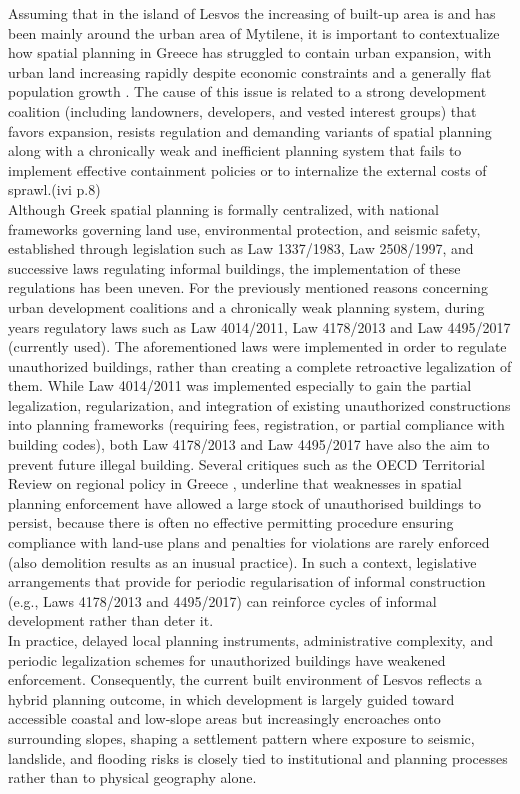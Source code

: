 \documentclass[10pt, twocolumn, twoside]{article}
\begin{document}
Assuming that in the island of Lesvos the increasing of built-up area is and has been mainly around the urban area of Mytilene, it is important to contextualize how spatial planning in Greece has struggled to contain urban expansion, with urban land increasing rapidly despite economic constraints and a generally flat population growth \cite{Stathakis2024Urbanization}. The cause of this issue is related to a strong development coalition (including landowners, developers, and vested interest groups) that favors expansion, resists regulation and demanding variants of spatial planning  along with a chronically weak and inefficient planning system that fails to implement effective containment policies or to internalize the external costs of sprawl.(ivi p.8)\\ 
Although Greek spatial planning is formally centralized, with national frameworks governing land use, environmental protection, and seismic safety, established through legislation such as Law 1337/1983, Law 2508/1997, and successive laws regulating informal buildings, the implementation of these regulations has been uneven. For the previously mentioned reasons concerning urban development coalitions and a chronically weak planning system, during years regulatory laws such as Law 4014/2011, Law 4178/2013 and Law 4495/2017 (currently used). The aforementioned laws were implemented in order to regulate unauthorized buildings, rather than creating a complete retroactive legalization of them.  While Law 4014/2011 was implemented especially to gain the partial legalization, regularization, and integration of existing unauthorized constructions into planning frameworks (requiring fees, registration, or partial compliance with building codes), both Law 4178/2013 and Law 4495/2017 have also the aim to  prevent future illegal building. Several critiques such as the OECD Territorial Review on regional policy in Greece \cite{oecd}, underline that weaknesses in spatial planning enforcement have allowed a large stock of unauthorised buildings to persist, because there is often no effective permitting procedure ensuring compliance with land-use plans and penalties for violations are rarely enforced (also demolition results as an inusual practice). In such a context, legislative arrangements that provide for periodic regularisation of informal construction (e.g., Laws 4178/2013 and 4495/2017) can reinforce cycles of informal development rather than deter it.\\
In practice, delayed local planning instruments, administrative complexity, and periodic legalization schemes for unauthorized buildings have weakened enforcement. Consequently, the current built environment of Lesvos reflects a hybrid planning outcome, in which development is largely guided toward accessible coastal and low-slope areas but increasingly encroaches onto surrounding slopes, shaping a settlement pattern where exposure to seismic, landslide, and flooding risks is closely tied to institutional and planning processes rather than to physical geography alone.
\end{document}
